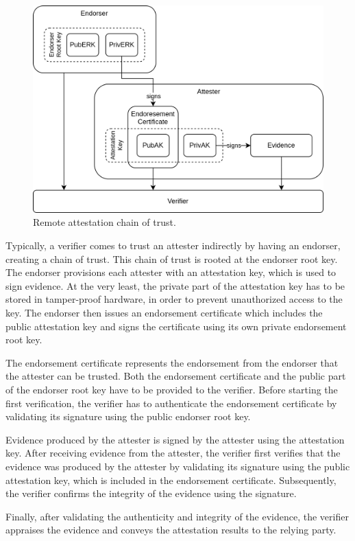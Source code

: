 \begin{figure}[H]
  \centering
  \includegraphics[width=0.7\linewidth]{resources/ra-chain-of-trust.drawio.png}
  \caption{Remote attestation chain of trust.}
  \label{fig:ra-chain-of-trust}
\end{figure}

Typically, a verifier comes to trust an attester indirectly by having an
endorser, creating a chain of trust. This chain of trust is rooted at the
endorser root key. The endorser provisions each attester with an attestation
key, which is used to sign evidence. At the very least, the private part of the
attestation key has to be stored in tamper-proof hardware, in order to prevent
unauthorized access to the key. The endorser then issues an endorsement
certificate which includes the public attestation key and signs the certificate
using its own private endorsement root key.

The endorsement certificate represents the endorsement from the endorser that
the attester can be trusted. Both the endorsement certificate and the public
part of the endorser root key have to be provided to the verifier. Before
starting the first verification, the verifier has to authenticate the
endorsement certificate by validating its signature using the public endorser
root key.

Evidence produced by the attester is signed by the attester using the
attestation key. After receiving evidence from the attester, the verifier first
verifies that the evidence was produced by the attester by validating its
signature using the public attestation key, which is included in the endorsement
certificate. Subsequently, the verifier confirms the integrity of the evidence
using the signature.

Finally, after validating the authenticity and integrity of the evidence, the
verifier appraises the evidence and conveys the attestation results to the
relying party.


